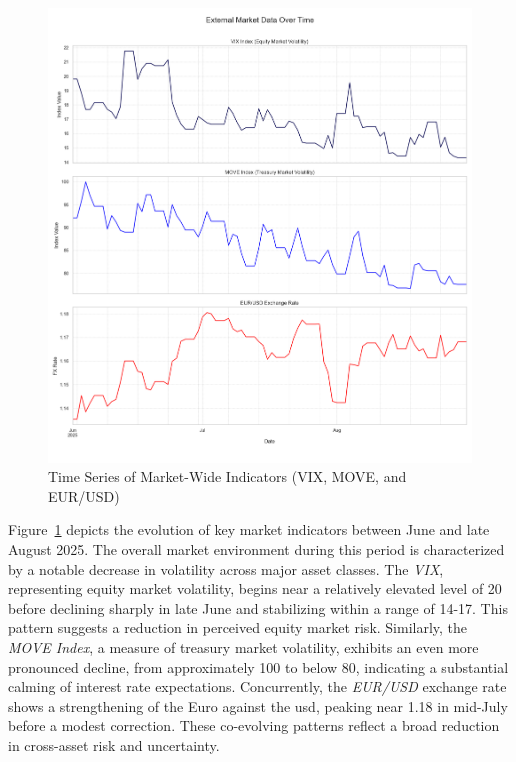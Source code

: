 \begin{figure}[H]
	\centering
	\includegraphics[width=1\textwidth]{images/descriptive_data_analysis/external_data_time_series.png}
	\caption{Time Series of Market-Wide Indicators (VIX, MOVE, and EUR/USD)}
	\label{fig:external_data_time_series}
\end{figure}

Figure~\ref{fig:external_data_time_series} depicts the evolution of key market indicators between June and late August 2025. The overall market environment during this period is characterized by a notable decrease in volatility across major asset classes. The \textit{VIX}, representing equity market volatility, begins near a relatively elevated level of 20 before declining sharply in late June and stabilizing within a range of 14-17. This pattern suggests a reduction in perceived equity market risk. Similarly, the \textit{MOVE Index}, a measure of treasury market volatility, exhibits an even more pronounced decline, from approximately 100 to below 80, indicating a substantial calming of interest rate expectations. Concurrently, the \textit{EUR/USD} exchange rate shows a strengthening of the Euro against the \ac{usd}, peaking near 1.18 in mid-July before a modest correction. These co-evolving patterns reflect a broad reduction in cross-asset risk and uncertainty.

